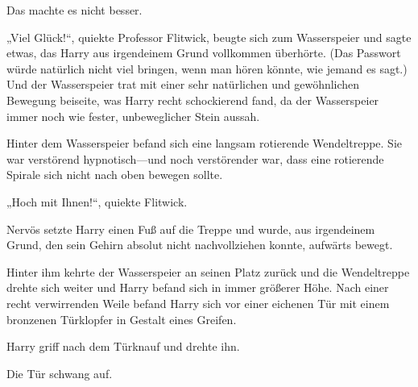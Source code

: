 Das machte es nicht besser.

„Viel Glück!“, quiekte Professor Flitwick, beugte sich zum Wasserspeier und sagte etwas, das Harry aus irgendeinem Grund vollkommen überhörte. (Das Passwort würde natürlich nicht viel bringen, wenn man hören könnte, wie jemand es sagt.) Und der Wasserspeier trat mit einer sehr natürlichen und gewöhnlichen Bewegung beiseite, was Harry recht schockierend fand, da der Wasserspeier immer noch wie fester, unbeweglicher Stein aussah.

Hinter dem Wasserspeier befand sich eine langsam rotierende Wendeltreppe. Sie war verstörend hypnotisch—und noch verstörender war, dass eine rotierende Spirale sich nicht nach oben bewegen sollte.

„Hoch mit Ihnen!“, quiekte Flitwick.

Nervös setzte Harry einen Fuß auf die Treppe und wurde, aus irgendeinem Grund, den sein Gehirn absolut nicht nachvollziehen konnte, aufwärts bewegt.

Hinter ihm kehrte der Wasserspeier an seinen Platz zurück und die Wendeltreppe drehte sich weiter und Harry befand sich in immer größerer Höhe. Nach einer recht verwirrenden Weile befand Harry sich vor einer eichenen Tür mit einem bronzenen Türklopfer in Gestalt eines Greifen.

Harry griff nach dem Türknauf und drehte ihn.

Die Tür schwang auf.

